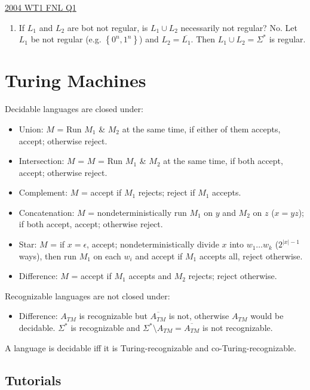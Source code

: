 \documentclass[10pt,landscape,a4paper]{article}
\newcommand{\set}[1]{\left \{ #1 \right \}}
\newcommand{\abs}[1]{\left | #1 \right |}
\begin{document}
\begin{multicols*}{3}
\underline{2004 WT1 FNL Q1}

\begin{enumerate}[label=\emph{\alph*)}]
    \item If $L_1$ and $L_2$ are bot not regular, is $L_1 \cup L_2$ necessarily not regular? No. Let $L_1$ be not regular (e.g. $\set{0^n, 1^n}$) and $L_2 = \overline{L_1}$. Then $L_1 \cup L_2 = \Sigma^*$ is regular.
\end{enumerate}

\section{Turing Machines}

Decidable languages are closed under:

\begin{itemize}
    \item Union: $M$ = Run $M_1$ \& $M_2$ at the same time, if either of them accepts, accept; otherwise reject.
    \item Intersection: $M$ = $M$ = Run $M_1$ \& $M_2$ at the same time, if both accept, accept; otherwise reject.
    \item Complement: $M$ = accept if $M_1$ rejects; reject if $M_1$ accepts.
    \item Concatenation: $M$ = nondeterministically run $M_1$ on $y$ and $M_2$ on $z$ ($x = yz$); if both accept, accept; otherwise reject.
    \item Star: $M$ = if $x = \epsilon$, accept; nondeterministically divide $x$ into $w_1\ldots w_k$ ($2^{\abs{x}-1}$ ways), then run $M_1$ on each $w_i$ and accept if $M_1$ accepts all, reject otherwise.
    \item Difference: $M$ = accept if $M_1$ accepts and $M_2$ rejects; reject otherwise.
\end{itemize}

Recognizable languages are not closed under:

\begin{itemize}
    \item Difference: $A_{TM}$ is recognizable but $\overline{A_{TM}}$ is not, otherwise $A_{TM}$ would be decidable. $\Sigma^*$ is recognizable and $\Sigma^* \setminus A_{TM} = \overline{A_{TM}}$ is not recognizable.
\end{itemize}

A language is decidable iff it is Turing-recognizable and co-Turing-recognizable.

\subsection{Tutorials}


\end{multicols*}
\end{document}
